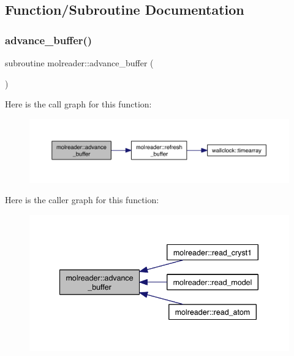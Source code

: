\subsection{Function/\+Subroutine Documentation}
\mbox{\label{namespacemolreader_ac7b950f165e89b12ccc8fff1c0f3bae9}} 
\subsubsection{\texorpdfstring{advance\+\_\+buffer()}{advance\_buffer()}}
{\footnotesize\ttfamily subroutine molreader\+::advance\+\_\+buffer (\begin{DoxyParamCaption}{ }\end{DoxyParamCaption})\hspace{0.3cm}{\ttfamily [private]}}

Here is the call graph for this function\+:\nopagebreak
\begin{figure}[H]
\begin{center}
\leavevmode
\includegraphics[width=350pt]{namespacemolreader_ac7b950f165e89b12ccc8fff1c0f3bae9_cgraph}
\end{center}
\end{figure}
Here is the caller graph for this function\+:\nopagebreak
\begin{figure}[H]
\begin{center}
\leavevmode
\includegraphics[width=340pt]{namespacemolreader_ac7b950f165e89b12ccc8fff1c0f3bae9_icgraph}
\end{center}
\end{figure}
\mbox{\label{namespacemolreader_a7a4cb6436916cd4b8ee0341d528e9c73}} 
